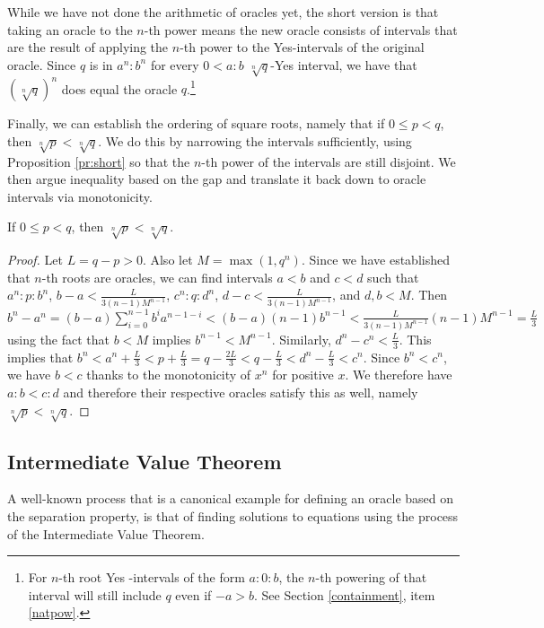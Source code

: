 \documentclass[12pt]{article}
\begin{document}
While we have not done the arithmetic of oracles yet, the short version is that taking an oracle to the $n$-th power means the new oracle consists of intervals that are the result of applying the $n$-th power to the Yes-intervals of the original oracle. Since $q$ is in $a^n:b^n$ for every $0<a:b$ $\sqrt[n]{q}$-Yes interval, we have that $(\sqrt[n]{q})^n$ does equal the oracle $q$.\footnote{For $n$-th root Yes -intervals of the form $a:0:b$, the $n$-th powering of that interval will still include $q$ even if $-a>b$. See Section \ref{containment}, item \ref{natpow}.} 

Finally, we can establish the ordering of square roots, namely that if $0 \leq p<q$, then $\sqrt[n]{p} < \sqrt[n]{q}$. We do this by narrowing the intervals sufficiently, using Proposition \ref{pr:short} so that the $n$-th power of the intervals are still disjoint. We then argue inequality based on the gap and translate it back down to oracle intervals via monotonicity. 

\begin{proposition}
    If $0 \leq p <q$, then $\sqrt[n]{p} < \sqrt[n]{q}$.
\end{proposition}

\begin{proof}
    Let $L = q-p > 0$. Also let $M = \max(1, q^n)$.  Since we have established that $n$-th roots are oracles, we can find intervals $a\lt b$ and $c \lt d$ such that $a^n:p:b^n$, $b-a < \frac{L}{3(n-1)M^{n-1}}$, $c^n:q:d^n$, $d-c < \frac{L}{3(n-1)M^{n-1}}$,  and $d, b < M$.  Then $b^n-a^n = (b-a) \sum_{i=0}^{n-1} b^i a^{n-1-i} < (b-a)(n-1) b^{n-1} < \frac{L}{3(n-1)M^{n-1}} (n-1) M^{n-1} = \frac{L}{3}$ using the fact that $b<M$ implies $b^{n-1} < M^{n-1}$. Similarly, $d^n-c^n < \frac{L}{3}$. This implies that $b^n < a^n + \frac{L}{3}  < p + \frac{L}{3}  = q - \frac{2 L }{3} < q -  \frac{L}{3} < d^n - \frac{L}{3} < c^n$. Since $b^n < c^n$, we have $b < c$ thanks to the monotonicity of $x^n$ for positive $x$. We therefore have $a:b < c:d$ and therefore their respective oracles satisfy this as well, namely $\sqrt[n]{p} < \sqrt[n]{q}$.
\end{proof}



\subsection{Intermediate Value Theorem}\label{sec:ivt}

A well-known process that is a canonical example for defining an oracle based on the separation property, is that of finding solutions to equations using the process of the Intermediate Value Theorem. 
\end{document}

